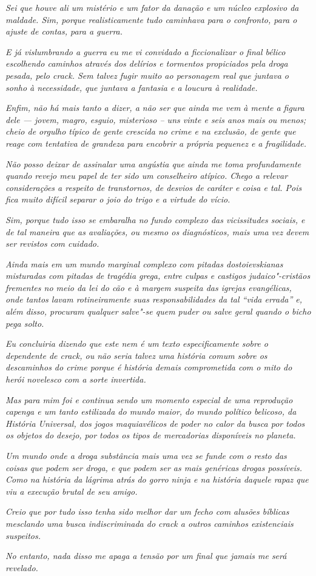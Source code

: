 \emph{Sei que houve ali um mistério e um fator da danação e um núcleo
explosivo da maldade. Sim, porque realisticamente tudo caminhava para o
confronto, para o ajuste de contas, para a guerra.}

\emph{E já vislumbrando a guerra eu me vi convidado a ficcionalizar o
final bélico escolhendo caminhos através dos delírios e tormentos
propiciados pela droga pesada, pelo crack. Sem talvez fugir muito ao
personagem real que juntava o sonho à necessidade, que juntava a
fantasia e a loucura à realidade.}

\emph{Enfim, não há mais tanto a dizer, a não ser que ainda me vem à
mente a figura dele --- jovem, magro, esguio, misterioso -- uns vinte e
seis anos mais ou menos; cheio de orgulho típico de gente crescida no
crime e na exclusão, de gente que reage com tentativa de grandeza para
encobrir a própria pequenez e a fragilidade.}

\emph{Não posso deixar de assinalar uma angústia que ainda me toma
profundamente quando revejo meu papel de ter sido um conselheiro
atípico. Chego a relevar considerações a respeito de transtornos, de
desvios de caráter e coisa e tal. Pois fica muito difícil separar o joio
do trigo e a virtude do vício.}

\emph{Sim, porque tudo isso se embaralha no fundo complexo das
vicissitudes sociais, e de tal maneira que as avaliações, ou mesmo os
diagnósticos, mais uma vez devem ser revistos com cuidado.}

\emph{Ainda mais em um mundo marginal complexo com pitadas
dostoievskianas misturadas com pitadas de tragédia grega, entre culpas e
castigos judaico"-cristãos frementes no meio da lei do cão e à margem
suspeita das igrejas evangélicas, onde tantos lavam rotineiramente suas
responsabilidades da tal ``vida errada'' e, além disso, procuram
qualquer salve"-se quem puder ou salve geral quando o bicho pega solto.}

\emph{Eu concluiria dizendo que este nem é um texto especificamente
sobre o dependente de crack, ou não seria talvez uma história comum sobre
os descaminhos do crime porque é história demais comprometida com o mito
do herói novelesco com a sorte invertida.}

\emph{Mas para mim foi e continua sendo um momento especial de uma
reprodução capenga e um tanto estilizada do mundo maior, do mundo
político belicoso, da História Universal, dos jogos maquiavélicos de
poder no calor da busca por todos os objetos do desejo, por todos os
tipos de mercadorias disponíveis no planeta.}

\emph{Um mundo onde a droga substância mais uma vez se funde com o resto
das coisas que podem ser droga, e que podem ser as mais genéricas drogas
possíveis. Como na história da lágrima atrás do gorro ninja e na história
daquele rapaz que viu a execução brutal de seu amigo.}

\emph{Creio que por tudo isso tenha sido melhor dar um fecho com alusões
bíblicas mesclando uma busca indiscriminada do crack a outros caminhos
existenciais suspeitos.}

\emph{No entanto, nada disso me apaga a tensão por um final que jamais
me será revelado.~}
\endgroup